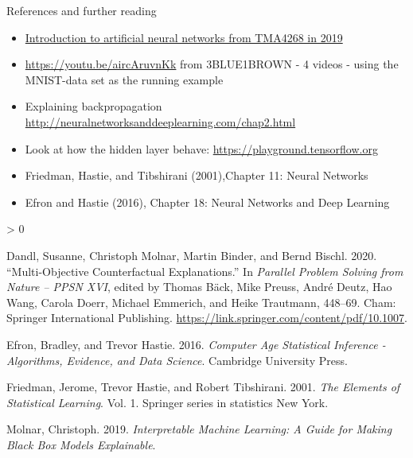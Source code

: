 \documentclass[
  ignorenonframetext,
]{beamer}
\providecommand{\tightlist}{%
  \setlength{\itemsep}{0pt}\setlength{\parskip}{0pt}}
\newlength{\cslhangindent}
\newenvironment{CSLReferences}[2] %
 {%
  \setlength{\parindent}{0pt}
  \ifodd #1 \everypar{\setlength{\hangindent}{\cslhangindent}}\ignorespaces\fi
  \ifnum #2 > 0
  \setlength{\parskip}{#2\baselineskip}
  \fi
 }%
 {}
\begin{document}
\begin{frame}{References and further reading}
\protect\hypertarget{references-and-further-reading}{}
\begin{itemize}
\tightlist
\item
  \href{https://www.math.ntnu.no/emner/TMA4268/2019v/11Nnet/11Nnet.html}{Introduction
  to artificial neural networks from TMA4268 in 2019}
\item
  \url{https://youtu.be/aircAruvnKk} from 3BLUE1BROWN - 4 videos - using
  the MNIST-data set as the running example
\item
  Explaining backpropagation
  \url{http://neuralnetworksanddeeplearning.com/chap2.html}
\item
  Look at how the hidden layer behave:
  \url{https://playground.tensorflow.org}
\item
  Friedman, Hastie, and Tibshirani (2001),Chapter 11: Neural Networks
\item
  Efron and Hastie (2016), Chapter 18: Neural Networks and Deep Learning
\end{itemize}

\hypertarget{refs}{}
\begin{CSLReferences}{1}{0}
\leavevmode\hypertarget{ref-Dandletal2020}{}%
Dandl, Susanne, Christoph Molnar, Martin Binder, and Bernd Bischl. 2020.
{``Multi-Objective Counterfactual Explanations.''} In \emph{Parallel
Problem Solving from Nature -- PPSN XVI}, edited by Thomas Bäck, Mike
Preuss, André Deutz, Hao Wang, Carola Doerr, Michael Emmerich, and Heike
Trautmann, 448--69. Cham: Springer International Publishing.
\url{https://link.springer.com/content/pdf/10.1007}.

\leavevmode\hypertarget{ref-casi}{}%
Efron, Bradley, and Trevor Hastie. 2016. \emph{Computer Age Statistical
Inference - Algorithms, Evidence, and Data Science}. Cambridge
University Press.

\leavevmode\hypertarget{ref-ESL}{}%
Friedman, Jerome, Trevor Hastie, and Robert Tibshirani. 2001. \emph{The
Elements of Statistical Learning}. Vol. 1. Springer series in statistics
New York.

\leavevmode\hypertarget{ref-molnar2019}{}%
Molnar, Christoph. 2019. \emph{Interpretable Machine Learning: A Guide
for Making Black Box Models Explainable}.

\end{CSLReferences}
\end{frame}
\end{document}
